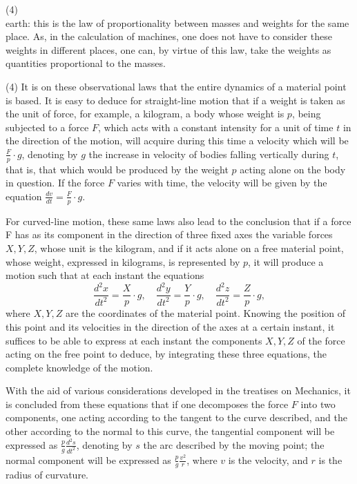 \documentclass{book}
\begin{document}
\newpage
(4) \\

earth: this is the law of proportionality between masses and weights for the same place. As, in the calculation of machines, one does not have to consider these weights in different places, one can, by virtue of this law, take the weights as quantities proportional to the masses.

 (4) It is on these observational laws that the entire dynamics of a material point is based. It is easy to deduce for straight-line motion that if a weight is taken as the unit of force, for example, a kilogram, a body whose weight is \(p\), being subjected to a force \(F\), which acts with a constant intensity for a unit of time 
\(t\) in the direction of the motion, will acquire during this time a velocity which will be \(\frac{F}{p} \cdot g\), denoting by \(g\) the increase in velocity of bodies falling vertically during \(t\),
that is, that which would be produced by the weight \(p\) acting alone on the body in question. If the force \(F\) varies with time, the velocity will be given by the equation \(\frac{dv}{dt} = \frac{F}{p} \cdot g\).

For curved-line motion, these same laws also lead to the conclusion that if a force F has as its component in the direction of three fixed axes the variable forces \(X, Y, Z\), whose unit is the kilogram, and if it acts alone on a free material point, whose weight, expressed in kilograms, is represented by \(p\), it will produce a motion such that at each instant the equations
\[
\frac{d^2x}{dt^2} = \frac{X}{p} \cdot g, \quad \frac{d^2y}{dt^2} = \frac{Y}{p} \cdot g, \quad \frac{d^2z}{dt^2} = \frac{Z}{p} \cdot g,
\]
where \(X,Y,Z \) are the coordinates of the material point. Knowing the position of this point and its velocities in the direction of the axes at a certain instant, it suffices to be able to express at each instant the components \( X, Y, Z \) of the force acting on the free point to deduce, by integrating these three equations, the complete knowledge of the motion.

With the aid of various considerations developed in the treatises on Mechanics, it is concluded from these equations that if one decomposes the force \( F \) into two components, one acting according to the tangent to the curve described, and the other according to the normal to this curve, the tangential component will be expressed as \( \frac{p}{g} \frac{d^2s}{dt^2} \), denoting by \( s \) the arc described by the moving point; the normal component will be expressed as \( \frac{p}{g} \frac{v^2}{r} \), where \( v \) is the velocity, and \( r \) is the radius of curvature.
\end{document}
